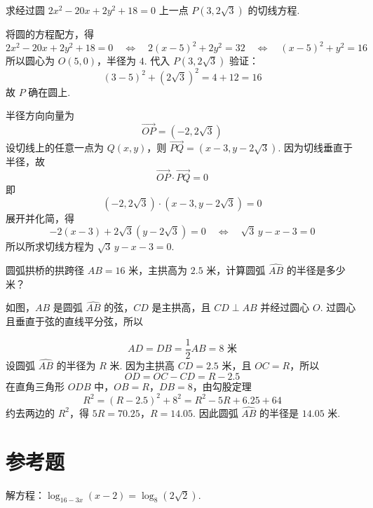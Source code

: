 \begin{problem}
求经过圆 \(2x^2-20x+2y^2+18=0\) 上一点 \(P\left(3,2\sqrt3\right)\) 的切线方程.
\end{problem}

\begin{solution}
将圆的方程配方，得
\[
2x^2-20x+2y^2+18=0
\quad\Longleftrightarrow\quad
2\left(x-5\right)^2+2y^2=32
\quad\Longleftrightarrow\quad
\left(x-5\right)^2+y^2=16
\]
所以圆心为 \(O(5,0)\)，半径为 \(4\). 代入 \(P\left(3,2\sqrt3\right)\) 验证：
\[
\left(3-5\right)^2+\left(2\sqrt3\right)^2=4+12=16
\]
故 \(P\) 确在圆上.

半径方向向量为
\[
\overrightarrow{OP}=\left(-2,2\sqrt3\right)
\]
设切线上的任意一点为 \(Q(x,y)\)，则 \(\overrightarrow{PQ}=\left(x-3,y-2\sqrt3\right)\). 因为切线垂直于半径，故
\[
\overrightarrow{OP}\cdot\overrightarrow{PQ}=0
\]
即
\[
\left(-2,2\sqrt3\right)\cdot\left(x-3,y-2\sqrt3\right)=0
\]
展开并化简，得
\[
-2\left(x-3\right)+2\sqrt3\left(y-2\sqrt3\right)=0
\quad\Longleftrightarrow\quad
\sqrt3\,y-x-3=0
\]
所以所求切线方程为 \(\sqrt3\,y-x-3=0\).
\end{solution}

\begin{problem}
圆弧拱桥的拱跨径 \(AB=16\text{ 米}\)，主拱高为 \(2.5\text{ 米}\)，计算圆弧 \(\widehat{AB}\) 的半径是多少米？
\end{problem}

\begin{solution}
如图，\(AB\) 是圆弧 \(\widehat{AB}\) 的弦，\(CD\) 是主拱高，且 \(CD\perp AB\) 并经过圆心 \(O\). 过圆心且垂直于弦的直线平分弦，所以


\[
AD=DB=\frac12AB=8\text{ 米}
\]
设圆弧 \(\widehat{AB}\) 的半径为 \(R\text{ 米}\). 因为主拱高 \(CD=2.5\text{ 米}\)，且 \(OC=R\)，所以
\[
OD=OC-CD=R-2.5
\]
在直角三角形 \(ODB\) 中，\(OB=R\)，\(DB=8\)，由勾股定理
\[
R^2=(R-2.5)^2+8^2
=R^2-5R+6.25+64
\]
约去两边的 \(R^2\)，得
\(5R=70.25\)，\(R=14.05\).
因此圆弧 \(\widehat{AB}\) 的半径是 \(14.05\text{ 米}\).
\end{solution}

\section{参考题}

\begin{problem}
解方程：\(\log_{16-3x}\left(x-2\right)=\log_8\left(2\sqrt2\right)\).
\end{problem}

